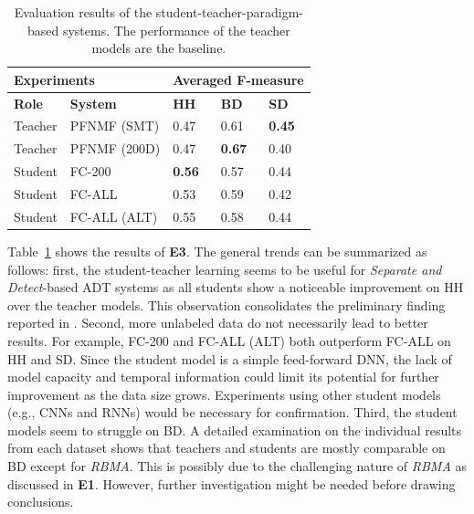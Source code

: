 \documentclass{article}
\newcommand{\comment}[1]{{\textcolor{blue}{#1}}}
\begin{document}
\begin{table}[]
\centering
\begin{tabularx}{\columnwidth}{XXXXX}
\hline
\multicolumn{2}{l}{\textbf{Experiments}}                    & \multicolumn{3}{l}{\textbf{Averaged F-measure}} \\ \hline
\textbf{Role} & \multicolumn{1}{l|}{\textbf{System}}        & \textbf{HH}    & \textbf{BD}    & \textbf{SD}   \\ \hline
Teacher       & \multicolumn{1}{l|}{PFNMF (SMT)}            & 0.47           & 0.61           & \textbf{0.45} \\
Teacher       & \multicolumn{1}{l|}{PFNMF (200D)}           & 0.47           & \textbf{0.67}  & 0.40          \\
Student       & \multicolumn{1}{l|}{FC-200}                & \textbf{0.56}  & 0.57           & 0.44          \\
Student       & \multicolumn{1}{l|}{FC-ALL}               & 0.53           & 0.59           & 0.42          \\
Student       & \multicolumn{1}{l|}{FC-ALL (ALT)} & 0.55           & 0.58           & 0.44          \\ \hline
\end{tabularx}
\caption{Evaluation results of the student-teacher-paradigm-based systems. The performance of the teacher models are the baseline.}%
\label{tab:e3result}
\end{table}


Table~\ref{tab:e3result} shows the results of \textbf{E3}. The general trends can be summarized as follows: first, the student-teacher learning seems to be useful for \textit{Separate and Detect}-based ADT systems as all students show a noticeable improvement on HH over the teacher models. This observation consolidates the preliminary finding reported in \cite{Wu2017}. Second, more unlabeled data do not necessarily lead to better results. For example, FC-200 and FC-ALL (ALT) both outperform FC-ALL on HH and SD. 
Since the student model is a simple feed-forward DNN, the lack of model capacity and temporal information could limit its potential for further improvement as the data size grows. Experiments using other student models (e.g., CNNs and RNNs) would be necessary for confirmation.   
Third, the student models seem to struggle on BD. A detailed examination on the individual results from each dataset shows that teachers and students are mostly comparable on BD except for \textit{RBMA}. This is possibly due to the challenging nature of \textit{RBMA} as discussed in \textbf{E1}. However, further investigation might be needed before drawing conclusions. %
\end{document}

